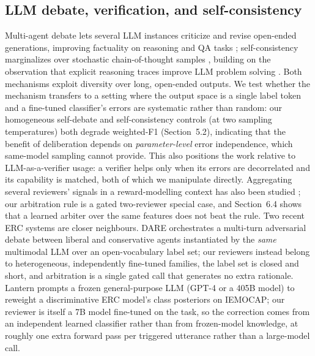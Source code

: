\documentclass[final,5p,times,twocolumn]{elsarticle}
\begin{document}
\subsection{LLM debate, verification, and self-consistency}
Multi-agent debate lets several LLM instances criticize and revise open-ended
generations, improving factuality on reasoning and QA tasks
\citep{du2023debate}; self-consistency marginalizes over stochastic
chain-of-thought samples \citep{wang2023selfconsistency}, building on the
observation that explicit reasoning traces improve LLM problem solving
\citep{wei2022chain,kojima2022large}. Both mechanisms
exploit diversity over long, open-ended outputs. We test whether the mechanism
transfers to a setting where the output space is a single label token and a
fine-tuned classifier's errors are systematic rather than random: our
homogeneous self-debate and self-consistency controls (at two sampling
temperatures) both degrade weighted-F1 (Section~5.2), indicating that the
benefit of deliberation depends on \emph{parameter-level} error independence,
which same-model sampling cannot provide. This also positions the work
relative to LLM-as-a-verifier usage: a verifier helps only when its errors are
decorrelated and its capability is matched, both of which we manipulate
directly. Aggregating several reviewers' signals in a reward-modelling context
has also been studied \citep{li2023inferring}; our arbitration rule
is a gated two-reviewer special case, and Section~6.4 shows that a learned
arbiter over the same features does not beat the rule. Two recent ERC systems
are closer neighbours. DARE \citep{huang2025dare} orchestrates a multi-turn
adversarial debate between liberal and conservative agents instantiated by
the \emph{same} multimodal LLM over an open-vocabulary label set; our
reviewers instead belong to heterogeneous, independently fine-tuned
families, the label set is closed and short, and arbitration is a single
gated call that generates no extra rationale. Lantern
\citep{zhang2024lantern} prompts a frozen general-purpose LLM (GPT-4 or a
405B model) to reweight a discriminative ERC model's class posteriors on
IEMOCAP; our reviewer is itself a 7B model fine-tuned on the task, so the
correction comes from an independent learned classifier rather than from
frozen-model knowledge, at roughly one extra forward pass per triggered
utterance rather than a large-model call.
\end{document}
